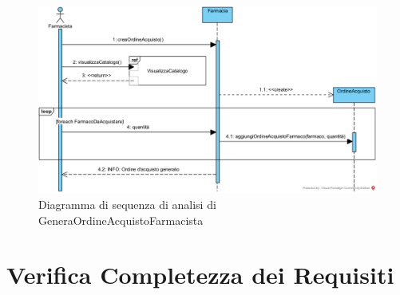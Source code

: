 \begin{figure}[!hbp]
	\centering
	\includegraphics[width=\linewidth]{assets/sequence_analisi/GeneraOrdineAcquistoFarmacista.png}
	\caption{Diagramma di sequenza di analisi di GeneraOrdineAcquistoFarmacista}
\end{figure}

\section{Verifica Completezza dei Requisiti}

